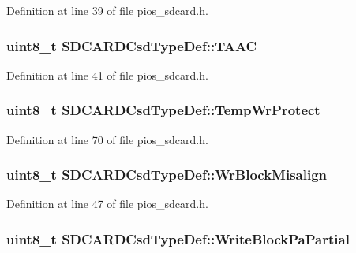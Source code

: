 \-Definition at line 39 of file pios\-\_\-sdcard.\-h.

\hypertarget{group___p_i_o_s___s_d_c_a_r_d_gaec29af38b2fc16f147533e11c61e2787}{
\subsubsection[{\-T\-A\-A\-C}]{\setlength{\rightskip}{0pt plus 5cm}uint8\-\_\-t {\bf \-S\-D\-C\-A\-R\-D\-Csd\-Type\-Def\-::\-T\-A\-A\-C}}}\label{group___p_i_o_s___s_d_c_a_r_d_gaec29af38b2fc16f147533e11c61e2787}


\-Definition at line 41 of file pios\-\_\-sdcard.\-h.

\hypertarget{group___p_i_o_s___s_d_c_a_r_d_ga3a9535629b4573d3dbe39dabd51b341a}{
\subsubsection[{\-Temp\-Wr\-Protect}]{\setlength{\rightskip}{0pt plus 5cm}uint8\-\_\-t {\bf \-S\-D\-C\-A\-R\-D\-Csd\-Type\-Def\-::\-Temp\-Wr\-Protect}}}\label{group___p_i_o_s___s_d_c_a_r_d_ga3a9535629b4573d3dbe39dabd51b341a}


\-Definition at line 70 of file pios\-\_\-sdcard.\-h.

\hypertarget{group___p_i_o_s___s_d_c_a_r_d_gac79fcdd1037496c353ac1570fb9a58a5}{
\subsubsection[{\-Wr\-Block\-Misalign}]{\setlength{\rightskip}{0pt plus 5cm}uint8\-\_\-t {\bf \-S\-D\-C\-A\-R\-D\-Csd\-Type\-Def\-::\-Wr\-Block\-Misalign}}}\label{group___p_i_o_s___s_d_c_a_r_d_gac79fcdd1037496c353ac1570fb9a58a5}


\-Definition at line 47 of file pios\-\_\-sdcard.\-h.

\hypertarget{group___p_i_o_s___s_d_c_a_r_d_gaa2d30b075bc701aef9e50397db088180}{
\subsubsection[{\-Write\-Block\-Pa\-Partial}]{\setlength{\rightskip}{0pt plus 5cm}uint8\-\_\-t {\bf \-S\-D\-C\-A\-R\-D\-Csd\-Type\-Def\-::\-Write\-Block\-Pa\-Partial}}}\label{group___p_i_o_s___s_d_c_a_r_d_gaa2d30b075bc701aef9e50397db088180}


